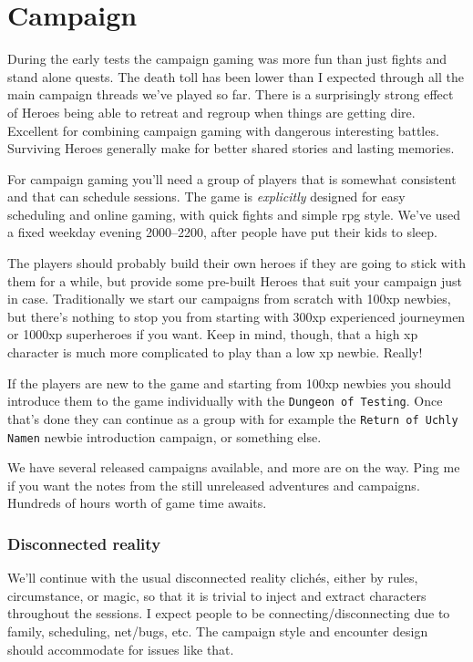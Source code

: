 

\cleardoublepage

\chapter*{Campaign}


During the early tests the campaign gaming was more fun than just fights and stand alone quests. The death toll has been lower than I expected through all the main campaign threads we've played so far. There is a surprisingly strong effect of Heroes being able to retreat and regroup when things are getting dire. Excellent for combining campaign gaming with dangerous interesting battles. Surviving Heroes generally make for better shared stories and lasting memories.

For campaign gaming you'll need a group of players that is somewhat consistent and that can schedule sessions. The game is \emph{explicitly} designed for easy scheduling and online gaming, with quick fights and simple rpg style. We've used a fixed weekday evening 2000--2200, after people have put their kids to sleep.

The players should probably build their own heroes if they are going to stick with them for a while, but provide some pre-built Heroes that suit your campaign just in case. Traditionally we start our campaigns from scratch with 100xp newbies, but there's nothing to stop you from starting with 300xp experienced journeymen or 1000xp superheroes if you want. Keep in mind, though, that a high xp character is much more complicated to play than a low xp newbie. Really!

If the players are new to the game and starting from 100xp newbies you should introduce them to the game individually with the \texttt{Dungeon of Testing}. Once that's done they can continue as a group with for example the \texttt{Return of Uchly Namen} newbie introduction campaign, or something else.

We have several released campaigns available, and more are on the way. Ping me if you want the notes from the still unreleased adventures and campaigns. Hundreds of hours worth of game time awaits.


\subsection*{Disconnected reality}
We'll continue with the usual disconnected reality clichés, either by rules, circumstance, or magic, so that it is trivial to inject and extract characters throughout the sessions. I expect people to be connecting/disconnecting due to family, scheduling, net/bugs, etc. The campaign style and encounter design should accommodate for issues like that.


